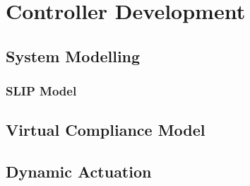 \chapter{Controller Development}
\section{System Modelling}
\subsection{SLIP Model}
\section{Virtual Compliance Model}
\section{Dynamic Actuation}
